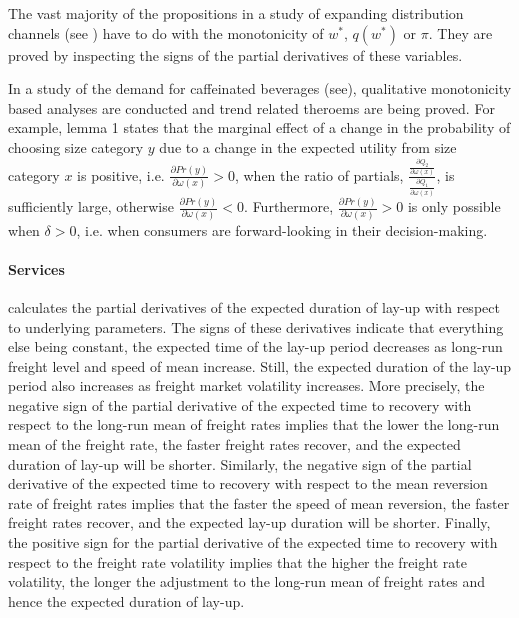 \documentclass[11pt]{book}
\begin{document}
The vast majority of the propositions in a study of expanding distribution channels (see \cite{matsushima2017expanding})
have to do with the monotonicity of $w^{*}$, $q\left(w^{*}\right)$
or $\pi$. They are proved by inspecting the signs of the partial
derivatives of these variables.

In a study of the demand for caffeinated beverages (see\cite{liao2021essays}), qualitative monotonicity based
analyses are conducted and trend related theroems are being proved.
For example, lemma 1 states that the marginal effect of a change in
the probability of choosing size category $y$ due to a change in
the expected utility from size category $x$ is positive, i.e. $\frac{\partial Pr(y)}{\partial\omega\left(x\right)}>0$,
when the ratio of partials, $\frac{\frac{\partial Q_{2}}{\partial\omega\left(x\right)}}{\frac{\partial Q_{1}}{\partial\omega\left(x\right)}}$,
is sufficiently large, otherwise $\frac{\partial Pr(y)}{\partial\omega\left(x\right)}<0$.
Furthermore, $\frac{\partial Pr(y)}{\partial\omega\left(x\right)}>0$
is only possible when $\delta>0$, i.e. when consumers are forward-looking
in their decision-making.


\paragraph{Services}

\cite{alizadeh2017capacity} calculates the partial derivatives of
the expected duration of lay-up with respect to underlying parameters.
The signs of these derivatives indicate that everything else being
constant, the expected time of the lay-up period decreases as long-run
freight level and speed of mean increase. Still, the expected duration
of the lay-up period also increases as freight market volatility increases.
More precisely, the negative sign of the partial derivative of the
expected time to recovery with respect to the long-run mean of freight
rates implies that the lower the long-run mean of the freight rate,
the faster freight rates recover, and the expected duration of lay-up
will be shorter. Similarly, the negative sign of the partial derivative
of the expected time to recovery with respect to the mean reversion
rate of freight rates implies that the faster the speed of mean reversion,
the faster freight rates recover, and the expected lay-up duration
will be shorter. Finally, the positive sign for the partial derivative
of the expected time to recovery with respect to the freight rate
volatility implies that the higher the freight rate volatility, the
longer the adjustment to the long-run mean of freight rates and hence
the expected duration of lay-up.
\end{document}

